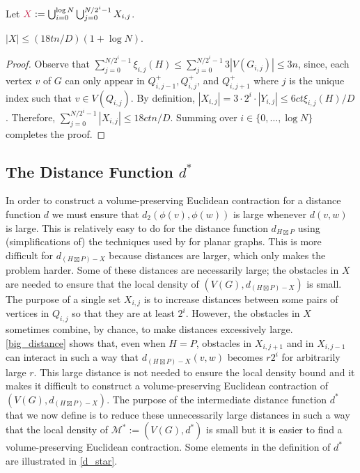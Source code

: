 \documentclass{patmorin}
\makeatletter
\renewcommand{\le}{\leqslant}
\def\mathcolor#1#{\@mathcolor{#1}}
\def\@mathcolor#1#2#3{%
  \protect\leavevmode
  \begingroup
    \color#1{#2}#3%
  \endgroup
}
\newcommand{\mathdefin}[1]{\mathcolor{brightmaroon}{#1}}
\makeatother
\begin{document}
Let $\mathdefin{X}:=\bigcup_{i=0}^{\log N}\bigcup_{j=0}^{N/2^i-1} X_{i,j}$.

\begin{lem}
  $|X|\le (18tn/D)(1+\log N)$.
\end{lem}

\begin{proof}
  Observe that $\sum_{j=0}^{N/2^i-1} \xi_{i,j}(H)\le\sum_{j=0}^{N/2^i-1} 3|V(G_{i,j})| \le 3n$, since, each vertex $v$ of $G$ can only appear in $Q^+_{i,j-1}, Q^+_{i,j}$, and $Q^+_{i,j+1}$ where $j$ is the unique index such that $v\in V(Q_{i,j})$.    By definition, $|X_{i,j}|=3\cdot 2^i \cdot |Y_{i,j}| \le 6ct\xi_{i,j}(H)/D$.  Therefore, $\sum_{j=0}^{N/2^i-1} |X_{i,j}|\le 18ctn/D$. Summing over $i\in\{0,\ldots,\log N\}$ completes the proof.
\end{proof}

\subsection{\boldmath The Distance Function $d^*$}

In order to construct a volume-preserving Euclidean contraction for a distance function $d$ we must ensure that $d_2(\phi(v),\phi(w))$ is large whenever $d(v,w)$ is large.  This is relatively easy to do for the distance function $d_{H\boxtimes P}$ using (simplifications of) the techniques used by \citet{rao:small} for planar graphs. This is more difficult for $d_{(H\boxtimes P)-X}$ because distances are larger, which only makes the problem harder.  Some of these distances are necessarily large; the obstacles in $X$ are needed to ensure that the local density of $(V(G),d_{(H\boxtimes P)-X})$ is small.  The purpose of a single set $X_{i,j}$ is to increase distances between some pairs of vertices in $Q_{i,j}$ so that they are at least $2^i$.  However, the obstacles in $X$ sometimes combine, by chance, to make distances excessively large. \cref{big_distance} shows that, even when $H=P$, obstacles in $X_{i,j+1}$ and in $X_{i,j-1}$ can interact in such a way that $d_{(H\boxtimes P)-X}(v,w)$ becomes $r2^i$ for arbitrarily large $r$.  This large distance is not needed to ensure the local density bound and it makes it difficult to construct a volume-preserving Euclidean contraction of $(V(G),d_{(H\boxtimes P)-X})$.  The purpose of the intermediate distance function $d^*$ that we now define is to reduce these unnecessarily large distances in such a way that the local density of $\mathcal{M}^*:=(V(G),d^*)$ is small but it is easier to find a volume-preserving Euclidean contraction. Some elements in the definition of $d^*$ are illustrated in \cref{d_star}.
\end{document}
